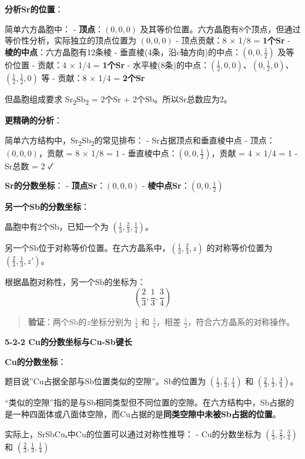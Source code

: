 \textbf{分析Sr的位置}：

简单六方晶胞中：
- \textbf{顶点}：\((0, 0, 0)\) 及其等价位置。六方晶胞有8个顶点，但通过等价性分析，实际独立的顶点位置为 \((0, 0, 0)\)
- 顶点贡献：8 × 1/8 = \textbf{1个Sr}
- \textbf{棱的中点}：六方晶胞有12条棱
- 垂直棱(4条，沿\(c\)轴方向)的中点：\((0, 0, \frac{1}{2})\) 及等价位置
- 贡献：4 × 1/4 = \textbf{1个Sr}
- 水平棱(8条)的中点：\((\frac{1}{2}, 0, 0)\)、\((0, \frac{1}{2}, 0)\)、\((\frac{1}{2}, \frac{1}{2}, 0)\) 等
- 贡献：8 × 1/4 = \textbf{2个Sr}

但晶胞组成要求 Sr\textsubscript{2}Sb\textsubscript{2} = 2个Sr + 2个Sb。所以Sr总数应为2。

\textbf{更精确的分析}：

简单六方结构中，Sr\textsubscript{2}Sb\textsubscript{2}的常见排布：
- Sr占据顶点和垂直棱中点
- 顶点：\((0, 0, 0)\)，贡献 = 8 × 1/8 = 1
- 垂直棱中点：\((0, 0, \frac{1}{2})\)，贡献 = 4 × 1/4 = 1
- Sr总数 = 2 ✓

\textbf{Sr的分数坐标}：
- \textbf{顶点Sr}：\((0, 0, 0)\)
- \textbf{棱中点Sr}：\((0, 0, \frac{1}{2})\)

\textbf{另一个Sb的分数坐标}：

晶胞中有2个Sb，已知一个为 \((\frac{1}{3}, \frac{2}{3}, \frac{1}{4})\)。

另一个Sb位于对称等价位置。在六方晶系中，\((\frac{1}{3}, \frac{2}{3}, z)\) 的对称等价位置为 \((\frac{2}{3}, \frac{1}{3}, z')\)。

根据晶胞对称性，另一个Sb的坐标为：
\[(\frac{2}{3}, \frac{1}{3}, \frac{3}{4})\]

\begin{quote}
\textbf{验证}：两个Sb的\(z\)坐标分别为 \(\frac{1}{4}\) 和 \(\frac{3}{4}\)，相差 \(\frac{1}{2}\)，符合六方晶系的对称操作。
\end{quote}

\textbf{5-2-2 Cu的分数坐标与Cu-Sb键长}

\textbf{Cu的分数坐标}：

题目说''Cu占据全部与Sb位置类似的空隙''。Sb的位置为 \((\frac{1}{3}, \frac{2}{3}, \frac{1}{4})\) 和 \((\frac{2}{3}, \frac{1}{3}, \frac{3}{4})\)。

``类似的空隙''指的是与Sb相同类型但不同位置的空隙。在六方结构中，Sb占据的是一种四面体或八面体空隙，而Cu占据的是\textbf{同类空隙中未被Sb占据的位置}。

实际上，SrSbCuₓ中Cu的位置可以通过对称性推导：
- Cu的分数坐标为 \((\frac{1}{3}, \frac{2}{3}, \frac{3}{4})\) 和 \((\frac{2}{3}, \frac{1}{3}, \frac{1}{4})\)

